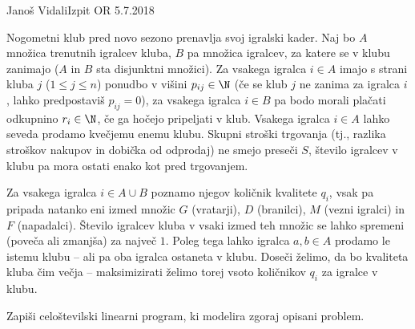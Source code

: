 \begin{naloga}{Janoš Vidali}{Izpit OR 5.7.2018}
\begin{vprasanje}
Nogometni klub pred novo sezono prenavlja svoj igralski kader.
Naj bo $A$ množica trenutnih igralcev kluba,
$B$ pa množica igralcev, za katere se v klubu zanimajo
($A$ in $B$ sta disjunktni množici).
Za vsakega igralca $i \in A$ imajo s strani kluba $j$ ($1 \le j \le n$)
ponudbo v višini $p_{ij} \in \N$
(če se klub $j$ ne zanima za igralca $i$, lahko predpostaviš $p_{ij} = 0$),
za vsakega igralca $i \in B$ pa bodo morali plačati odkupnino $r_i \in \N$,
če ga hočejo pripeljati v klub.
Vsakega igralca $i \in A$ lahko seveda prodamo kvečjemu enemu klubu.
Skupni stroški trgovanja
(tj., razlika stroškov nakupov in dobička od odprodaj)
ne smejo preseči $S$,
število igralcev v klubu pa mora ostati enako kot pred trgovanjem.

Za vsakega igralca $i \in A \cup B$ poznamo njegov količnik kvalitete $q_i$,
vsak pa pripada natanko eni izmed množic
$G$ (vratarji), $D$ (branilci), $M$ (vezni igralci) in $F$ (napadalci).
Število igralcev kluba v vsaki izmed teh množic se lahko spremeni
(poveča ali zmanjša) za največ $1$.
Poleg tega lahko igralca $a, b \in A$ prodamo le istemu klubu
-- ali pa oba igralca ostaneta v klubu.
Doseči želimo, da bo kvaliteta kluba čim večja
-- maksimizirati želimo torej vsoto količnikov $q_i$ za igralce v klubu.

Zapiši celoštevilski linearni program, ki modelira zgoraj opisani problem.
\end{vprasanje}


\end{naloga}
